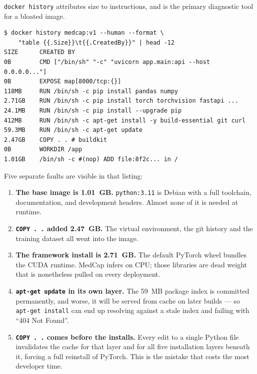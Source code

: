 \documentclass[10pt,a4paper]{article}
\newcommand{\cmd}[1]{\texttt{\small #1}}
\begin{document}
\cmd{docker history} attributes size to instructions, and is the primary
diagnostic tool for a bloated image.

\begin{lstlisting}[style=shell]
$ docker history medcap:v1 --human --format \
    "table {{.Size}}\t{{.CreatedBy}}" | head -12
SIZE      CREATED BY
0B        CMD ["/bin/sh" "-c" "uvicorn app.main:api --host 0.0.0.0..."]
0B        EXPOSE map[8000/tcp:{}]
118MB     RUN /bin/sh -c pip install pandas numpy
2.71GB    RUN /bin/sh -c pip install torch torchvision fastapi ...
24.1MB    RUN /bin/sh -c pip install --upgrade pip
412MB     RUN /bin/sh -c apt-get install -y build-essential git curl
59.3MB    RUN /bin/sh -c apt-get update
2.47GB    COPY . . # buildkit
0B        WORKDIR /app
1.01GB    /bin/sh -c #(nop) ADD file:8f2c... in /
\end{lstlisting}

Five separate faults are visible in that listing:

\begin{enumerate}[leftmargin=1.6em,itemsep=3pt]
  \item \textbf{The base image is 1.01~GB.} \texttt{python:3.11} is
        Debian with a full toolchain, documentation, and development
        headers. Almost none of it is needed at runtime.
  \item \textbf{\cmd{COPY . .} added 2.47~GB.} The virtual environment,
        the git history and the training dataset all went into the image.
  \item \textbf{The framework install is 2.71~GB.} The default PyTorch
        wheel bundles the CUDA runtime. MedCap infers on CPU; those
        libraries are dead weight that is nonetheless pulled on every
        deployment.
  \item \textbf{\cmd{apt-get update} in its own layer.} The 59~MB package
        index is committed permanently, and worse, it will be served
        from cache on later builds --- so \cmd{apt-get install} can end
        up resolving against a stale index and failing with
        ``404 Not Found''.
  \item \textbf{\cmd{COPY . .} comes before the installs.} Every edit to
        a single Python file invalidates the cache for that layer and
        for all five installation layers beneath it, forcing a full
        reinstall of PyTorch. This is the mistake that costs the most
        developer time.
\end{enumerate}


\end{document}

